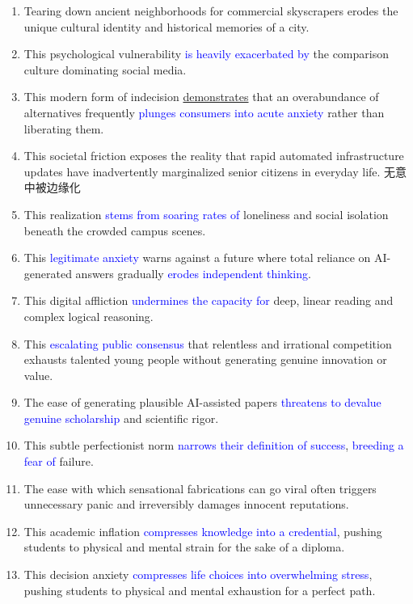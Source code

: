 \begin{enumerate}
    \item Tearing down ancient neighborhoods for commercial skyscrapers erodes the unique cultural identity and historical memories of a city.
    \item This psychological vulnerability \textcolor{blue}{is heavily exacerbated by} the comparison culture dominating social media.
    \item This modern form of indecision \underline{demonstrates} that an overabundance of alternatives frequently \textcolor{blue}{plunges consumers into acute anxiety} rather than liberating them. 
    \item  This societal friction exposes the reality that rapid automated infrastructure updates have inadvertently marginalized senior citizens in everyday life. 无意中被边缘化
    \item This realization \textcolor{blue}{stems from soaring rates of} loneliness and social isolation beneath the crowded campus scenes.
    \item This \textcolor{blue}{legitimate anxiety} warns against a future where total reliance on AI-generated answers gradually \textcolor{blue}{erodes independent thinking}. 
    \item This digital affliction \textcolor{blue}{undermines the capacity for} deep, linear reading and complex logical reasoning. 
    \item This  \textcolor{blue}{escalating public consensus} that relentless and irrational competition exhausts talented young people without generating genuine innovation or value. 
    \item The ease of generating plausible AI-assisted papers \textcolor{blue}{ threatens to devalue genuine scholarship} and scientific rigor. 
    \item This subtle perfectionist norm \textcolor{blue}{narrows their definition of success}, \textcolor{blue}{breeding a fear of} failure.
    \item  The ease with which sensational fabrications can go viral often triggers unnecessary panic and irreversibly damages innocent reputations. 
    \item This academic inflation \textcolor{blue}{compresses knowledge into a credential}, pushing students to physical and mental strain for the sake of a diploma.
    \item This decision anxiety \textcolor{blue}{compresses life choices into overwhelming stress}, pushing students to physical and mental exhaustion for a perfect path.

\end{enumerate}
